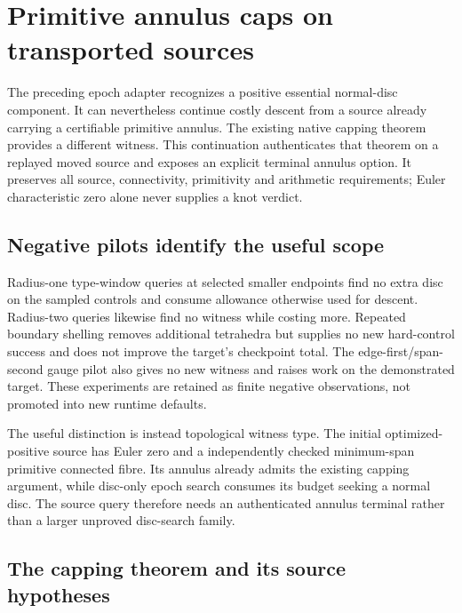 \section{Primitive annulus caps on transported sources}
\label{sec:transport-annulus}

The preceding epoch adapter recognizes a positive essential normal-disc
component. It can nevertheless continue costly descent from a source already
carrying a certifiable primitive annulus. The existing native capping theorem
provides a different witness. This continuation authenticates that theorem
on a replayed moved source and exposes an explicit terminal annulus option.
It preserves all source, connectivity, primitivity and arithmetic requirements;
Euler characteristic zero alone never supplies a knot verdict.

\subsection{Negative pilots identify the useful scope}

Radius-one type-window queries at selected smaller endpoints find no extra
disc on the sampled controls and consume allowance otherwise used for
descent. Radius-two queries likewise find no witness while costing more.
Repeated boundary shelling removes additional tetrahedra but supplies no new
hard-control success and does not improve the target's checkpoint total.
The edge-first/span-second gauge pilot also gives no new witness and raises
work on the demonstrated target. These experiments are retained as finite
negative observations, not promoted into new runtime defaults.

The useful distinction is instead topological witness type. The initial
optimized-positive source has Euler zero and a independently checked
minimum-span primitive connected fibre. Its annulus already admits the
existing capping argument, while disc-only epoch search consumes its budget
seeking a normal disc. The source query therefore needs an authenticated
annulus terminal rather than a larger unproved disc-search family.

\subsection{The capping theorem and its source hypotheses}

